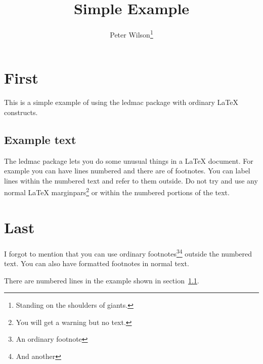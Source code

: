 \documentclass{article}
\title{Simple Example}
\author{Peter Wilson\thanks{Standing on the shoulders of giants.}}
\date{}
\begin{document}
\maketitle
\tableofcontents
\section{First}
   This is a simple example of using the \textsf{ledmac}
package with ordinary LaTeX constructs.

\subsection{Example text}\label{subsec}

\beginnumbering
\pstart
The \textsf{ledmac} package lets you do some unusual things in
a LaTeX document. For example you can have lines numbered and
there are
of footnotes.
You can label lines within the numbered text and refer to them
outside. Do not try and use any normal LaTeX
marginpars\footnote{You will get a warning but no text.}%
or 
within the numbered portions of the text.
\pend
\endnumbering

\section{Last}

    I forgot to mention that you can use ordinary
footnotes\footnote{An ordinary footnote}\footnote{And another}
outside the numbered text. You can also
have formatted footnotes
in normal text.

   There are  numbered lines in the example shown
in section~\ref{subsec}.
\end{document}
